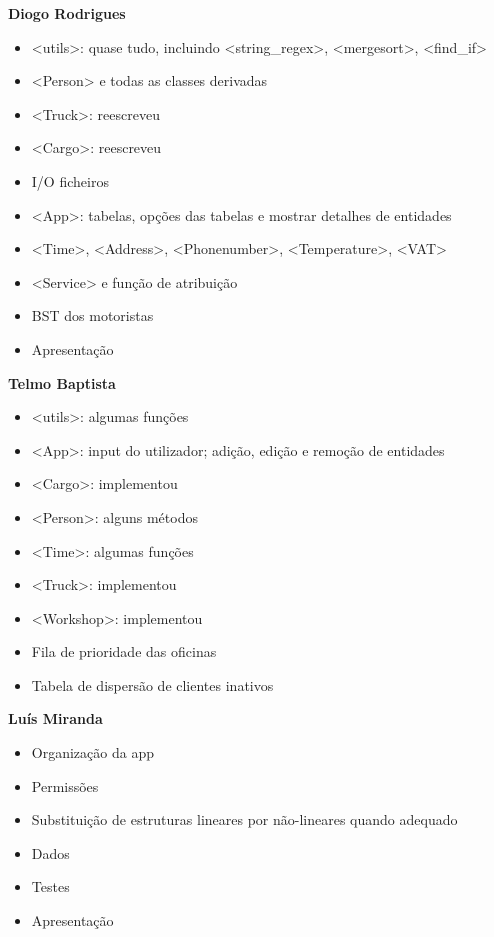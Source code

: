 \documentclass{beamer}
\def\texttt#1{<#1>}
\begin{document}
\begin{frame}
\begin{minipage}[t]{0.35\linewidth}
	\textbf{Diogo Rodrigues}
	{\footnotesize \begin{itemize}
		\item \texttt{utils}: quase tudo, incluindo \texttt{string\_regex}, \texttt{mergesort}, \texttt{find\_if}		
		\item \texttt{Person} e todas as classes derivadas
		\item \texttt{Truck}: reescreveu
		\item \texttt{Cargo}: reescreveu				
		\item I/O ficheiros
		\item \texttt{App}: tabelas, opções das tabelas e mostrar detalhes de entidades
		\item \texttt{Time}, \texttt{Address}, \texttt{Phonenumber}, \texttt{Temperature}, \texttt{VAT}
		\item \texttt{Service} e função de atribuição
		\item BST dos motoristas
		\item Apresentação
	\end{itemize} }
\end{minipage}%
\begin{minipage}[t]{0.32\linewidth}
	\textbf{Telmo Baptista}
	{\footnotesize \begin{itemize}
		\item \texttt{utils}: algumas funções
		\item \texttt{App}: input do utilizador; adição, edição e remoção de entidades
		\item \texttt{Cargo}: implementou
		\item \texttt{Person}: alguns métodos
		\item \texttt{Time}: algumas funções
		\item \texttt{Truck}: implementou
		\item \texttt{Workshop}: implementou
		\item Fila de prioridade das oficinas
		\item Tabela de dispersão de clientes inativos
	\end{itemize} }
\end{minipage}%
\begin{minipage}[t]{0.32\linewidth}
	\textbf{Luís Miranda}
	{\footnotesize \begin{itemize}
		\item Organização da app
		\item Permissões
		\item Substituição de estruturas lineares por não-lineares quando adequado
		\item Dados
		\item Testes
		\item Apresentação
	\end{itemize} }
\end{minipage}
\end{frame}
\end{document}
